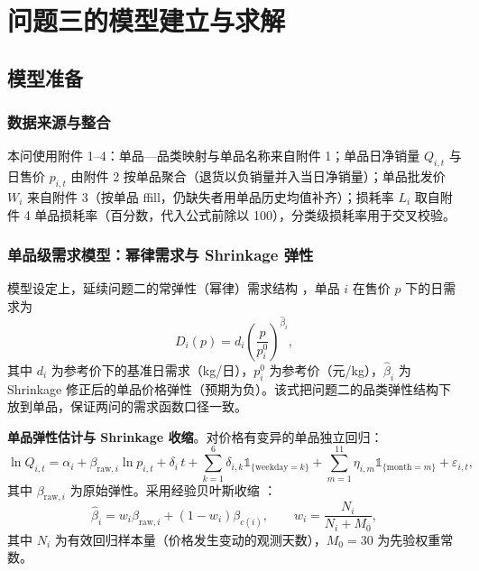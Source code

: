 \section{问题三的模型建立与求解}

\subsection{模型准备}

\subsubsection{数据来源与整合}

本问使用附件 1--4：单品—品类映射与单品名称来自附件 1；单品日净销量 $Q_{i,t}$ 与日售价 $p_{i,t}$ 由附件 2 按单品聚合（退货以负销量并入当日净销量）；单品批发价 $W_i$ 来自附件 3（按单品 ffill，仍缺失者用单品历史均值补齐）；损耗率 $L_i$ 取自附件 4 单品损耗率（百分数，代入公式前除以 100），分类级损耗率用于交叉校验。

\subsubsection{单品级需求模型：幂律需求与 Shrinkage 弹性}

模型设定上，延续问题二的常弹性（幂律）需求结构 \cite{tellis1988}，单品 $i$ 在售价 $p$ 下的日需求为
\begin{equation}
D_i(p)=d_i\left(\frac{p}{p_i^0}\right)^{\hat\beta_i},
\end{equation}
其中 $d_i$ 为参考价下的基准日需求（kg/日），$p_i^0$ 为参考价（元/kg），$\hat\beta_i$ 为 Shrinkage 修正后的单品价格弹性（预期为负）。该式把问题二的品类弹性结构下放到单品，保证两问的需求函数口径一致。

\textbf{单品弹性估计与 Shrinkage 收缩}。对价格有变异的单品独立回归：
\begin{equation}
\ln Q_{i,t}=\alpha_i+\beta_{\mathrm{raw},i}\ln p_{i,t}+\delta_i\,t+\sum_{k=1}^{6}\delta_{i,k}\mathbb{1}_{\{\mathrm{weekday}=k\}}+\sum_{m=1}^{11}\eta_{i,m}\mathbb{1}_{\{\mathrm{month}=m\}}+\varepsilon_{i,t},
\end{equation}
其中 $\beta_{\mathrm{raw},i}$ 为原始弹性。采用经验贝叶斯收缩 \cite{james1961,montgomery1997}：
\begin{equation}
\hat\beta_i = w_i\beta_{\mathrm{raw},i}+(1-w_i)\beta_{c(i)},\qquad w_i=\frac{N_i}{N_i+M_0},
\end{equation}
其中 $N_i$ 为有效回归样本量（价格发生变动的观测天数），$M_0=30$ 为先验权重常数。

